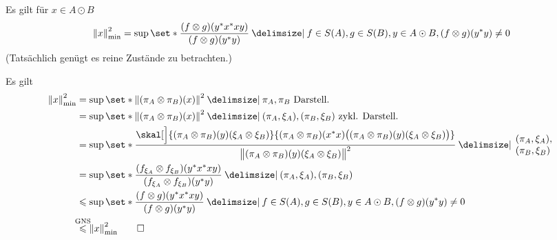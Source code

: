 \begin{satz}[label=satz:120]
	Es gilt für $x \in A \odot B$
	\[
		\norm*{x}^2_{\min} = \sup \set*{\frac{(f \otimes g) (y^*x^*xy)}{(f \otimes g)(y^*y)} \given f \in S(A), g \in S(B), y \in A \odot B, (f \otimes g)(y^* y)\neq 0 }
	\]
	(Tatsächlich genügt es reine Zustände zu betrachten.)
\end{satz}
\begin{beweis}
	Es gilt
	\begin{align}
		\norm*{x}_{\min}^2 &= \sup \set*{\norm*{(\pi_A \otimes \pi_B)(x)}^2 \given \pi_A, \pi_B \text{ Darstell.} } \\
		&= \sup \set*{ \norm*{(\pi_A \otimes \pi_B)(x)}^2 \given (\pi_A,\xi_A), (\pi_B,\xi_B) \text{ zykl. Darstell.}} \\
		&= \sup \set*{ \frac{\skal[\Big]{(\pi_A \otimes \pi_B)(y) \enbrace*{\xi_A \otimes \xi_B}}{(\pi_A \otimes \pi_B)(x^*x) \enbrace[\big]{ (\pi_A \otimes \pi_B)(y) \enbrace*{\xi_A \otimes \xi_B}}}}{\norm[\big]{(\pi_A \otimes \pi_B)(y) \enbrace*{\xi_A \otimes \xi_B}}^2}  \given\hspace{-3pt} \begin{array}{l}
	(\pi_A,\xi_A), \\
	(\pi_B, \xi_B)
\end{array} \hspace{-3pt}} \\
		&= \sup \set*{ \frac{\enbrace*{f_{\xi_A} \otimes f_{\xi_B}} \enbrace*{y^*x^*xy}}{\enbrace*{f_{\xi_A} \otimes f_{\xi_B} }(y^*y)} \given (\pi_A,\xi_A), (\pi_B, \xi_B)} \\
		&\le \sup \set*{ \frac{(f \otimes g)(y^*x^* xy)}{(f \otimes g)(y^*y)} \given f \in S(A) , g \in S(B), y \in A \odot B, (f \otimes g)(y^* y)\neq 0 } \\
		&\StackTextClap{GNS}{\le} \norm*{x}_{\min}^2 \qedhere
	\end{align}
\end{beweis}


